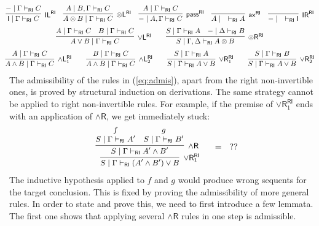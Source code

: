 \documentclass[submission,copyright,creativecommons]{eptcs}
\theoremstyle{definition}
\newcommand{\tl}{\otimes \mathsf{L}}
\newcommand{\tr}{\otimes \mathsf{R}}
\newcommand{\pass}{\mathsf{pass}}
\newcommand{\unitl}{\mathsf{IL}}
\newcommand{\unitr}{\mathsf{IR}}
\newcommand{\andlone}{\land \mathsf{L}_{1}}
\newcommand{\andltwo}{\land \mathsf{L}_{2}}
\newcommand{\andr}{\land \mathsf{R}}
\newcommand{\orl}{\lor \mathsf{L}}
\newcommand{\orrone}{\lor \mathsf{R}_{1}}
\newcommand{\orrtwo}{\lor \mathsf{R}_{2}}
\newcommand{\ax}{\mathsf{ax}}
\newcommand{\ot}{\otimes}
\newcommand{\I}{\mathsf{I}}
\newcommand{\RI}{\mathsf{RI}}
\newcommand{\proofbox}[1]{\begin{tabular}{l} #1 \end{tabular}}
\begin{document}
\begin{equation}\label{eq:admis}
  \hspace*{-4mm}
    \begin{array}{c}
      \infer[\unitl^{\RI}]{\I \mid \Gamma \vdash_{\RI} C}{{-} \mid \Gamma \vdash_{\RI} C}
      \quad
      \infer[\tl^{\RI}]{A \ot B \mid \Gamma \vdash_{\RI} C}{A \mid B, \Gamma \vdash_{\RI} C}
      \quad
      \infer[\pass^{\RI}]{{-} \mid A , \Gamma \vdash_{\RI} C}{A \mid \Gamma \vdash_{\RI} C}
      \quad
      \infer[\ax^{\RI}]{A \mid \quad \vdash_{\RI} A}{}
      \quad
      \infer[\unitr^{\RI}]{{-} \mid \quad \vdash_{\RI} \I}{}
  \\[6pt]
      \infer[\orl^{\RI}]{A \lor B \mid \Gamma \vdash_{\RI} C}{
      A \mid \Gamma \vdash_{\RI} C
      &
      B \mid \Gamma \vdash_{\RI} C
      }
      \qquad
      \infer[\tr^{\RI}]{S \mid \Gamma , \Delta \vdash_{\RI} A \ot B}{
        S \mid \Gamma \vdash_{\RI} A
        &
        {-} \mid \Delta \vdash_{\RI} B
      }
  \\[6pt]
      \infer[\andlone^{\RI}]{A \land B \mid \Gamma \vdash_{\RI} C}{A \mid \Gamma \vdash_{\RI} C}
      \qquad
      \infer[\andltwo^{\RI}]{A \land B \mid \Gamma \vdash_{\RI} C}{B \mid \Gamma \vdash_{\RI} C}
      \qquad
      \infer[\orrone^{\RI}]{S \mid \Gamma \vdash_{\RI} A \lor B}{S \mid \Gamma \vdash_{\RI} A}
      \qquad
      \infer[\orrtwo^{\RI}]{S \mid \Gamma \vdash_{\RI} A \lor B}{S \mid \Gamma \vdash_{\RI} B}
    \end{array}
  \end{equation}
The admissibility of the rules in (\ref{eq:admis}), apart from the right non-invertible ones, is proved by structural induction on derivations.
The same strategy cannot be applied to right non-invertible rules.
For example, if the premise of $\orrone^{\RI}$ ends with an application of $\andr$, we get immediately stuck:
\begin{displaymath}
  \begin{array}{c}
    \small
    \proofbox{
    \infer[\orrone^{\RI}]{S \mid \Gamma \vdash_{\RI} (A' \land B') \lor B}{
      \infer[\andr]{S \mid \Gamma \vdash_{\RI} A' \land B'}{
        \deduce{S \mid \Gamma \vdash_{\RI} A'}{f}
        &
        \deduce{S \mid \Gamma \vdash_{\RI} B'}{g}
      }
    }
    }
    \quad
    =
    \quad
    ??
  \end{array}
\end{displaymath}
The inductive hypothesis applied to $f$ and $g$ would produce wrong sequents for the target conclusion.
This is fixed by proving the admissibility of more general rules. In order to state and prove this, we need to first introduce a few lemmata. 
The first one shows that applying several $\andr$ rules in one step is admissible.
\end{document}
